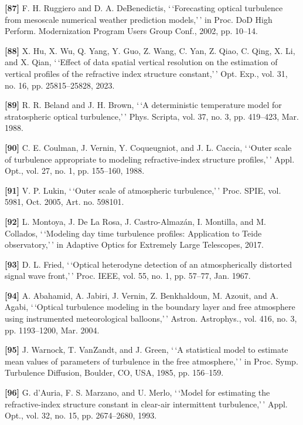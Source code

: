 \documentclass[
]{article}
\begin{document}
\textbf{{[}87{]}} F. H. Ruggiero and D. A. DeBenedictis, `\,`Forecasting
optical turbulence from mesoscale numerical weather prediction
models,'\,' in Proc. DoD High Perform. Modernization Program Users Group
Conf., 2002, pp. 10--14.

\textbf{{[}88{]}} X. Hu, X. Wu, Q. Yang, Y. Guo, Z. Wang, C. Yan, Z.
Qiao, C. Qing, X. Li, and X. Qian, `\,`Effect of data spatial vertical
resolution on the estimation of vertical profiles of the refractive
index structure constant,'\,' Opt. Exp., vol. 31, no. 16, pp.
25815--25828, 2023.

\textbf{{[}89{]}} R. R. Beland and J. H. Brown, `\,`A deterministic
temperature model for stratospheric optical turbulence,'\,' Phys.
Scripta, vol. 37, no. 3, pp. 419--423, Mar. 1988.

\textbf{{[}90{]}} C. E. Coulman, J. Vernin, Y. Coqueugniot, and J. L.
Caccia, `\,`Outer scale of turbulence appropriate to modeling
refractive-index structure profiles,'\,' Appl. Opt., vol. 27, no. 1, pp.
155--160, 1988.

\textbf{{[}91{]}} V. P. Lukin, `\,`Outer scale of atmospheric
turbulence,'\,' Proc. SPIE, vol. 5981, Oct. 2005, Art. no. 598101.

\textbf{{[}92{]}} L. Montoya, J. De La Rosa, J. Castro-Almazán, I.
Montilla, and M. Collados, `\,`Modeling day time turbulence profiles:
Application to Teide observatory,'\,' in Adaptive Optics for Extremely
Large Telescopes, 2017.

\textbf{{[}93{]}} D. L. Fried, `\,`Optical heterodyne detection of an
atmospherically distorted signal wave front,'\,' Proc. IEEE, vol. 55,
no. 1, pp. 57--77, Jan. 1967.

\textbf{{[}94{]}} A. Abahamid, A. Jabiri, J. Vernin, Z. Benkhaldoun, M.
Azouit, and A. Agabi, `\,`Optical turbulence modeling in the boundary
layer and free atmosphere using instrumented meteorological
balloons,'\,' Astron. Astrophys., vol. 416, no. 3, pp. 1193--1200, Mar.
2004.

\textbf{{[}95{]}} J. Warnock, T. VanZandt, and J. Green, `\,`A
statistical model to estimate mean values of parameters of turbulence in
the free atmosphere,'\,' in Proc. Symp. Turbulence Diffusion, Boulder,
CO, USA, 1985, pp. 156--159.

\textbf{{[}96{]}} G. d'Auria, F. S. Marzano, and U. Merlo, `\,`Model for
estimating the refractive-index structure constant in clear-air
intermittent turbulence,'\,' Appl. Opt., vol. 32, no. 15, pp.
2674--2680, 1993.
\end{document}
